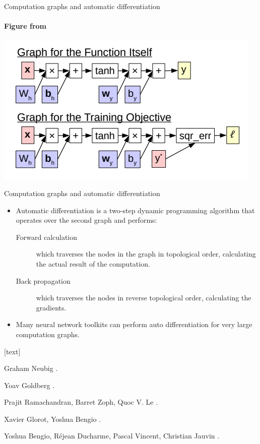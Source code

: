 \begin{frame}{Computation graphs and automatic differentiation}
\framesubtitle{Figure from \cite{Neubig2018}}
\includegraphics[scale=0.5]{figures/ff/compgraph.png}
\end{frame}

\begin{frame}{Computation graphs and automatic differentiation}
\begin{itemize}[<+->]
\item Automatic differentiation is a two-step dynamic programming algorithm that operates
over the second graph and performs:
\begin{description}
\item[Forward calculation] which traverses the nodes in the graph in topological order,
calculating the actual result of the computation.
\item[Back propagation] which traverses the nodes in reverse topological order, calculating
the gradients.
\end{description}
\item Many neural network toolkits can perform auto differentiation for very large computation graphs.
\end{itemize}
\end{frame}

\begin{frame}
[text]
\begin{thebibliography}{10}

\alert{Graham Neubig}
.

\alert{Yoav Goldberg}
.

\alert{Prajit Ramachandran, Barret Zoph, Quoc V. Le}
.

\alert{Xavier Glorot, Yoshua Bengio}
.

\alert{Yoshua Bengio, R\'ejean Ducharme, Pascal Vincent, Christian Jauvin}
.

\end{thebibliography}
\end{frame}




 
 

